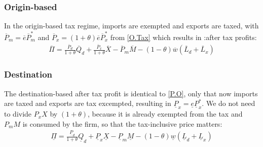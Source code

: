 \subsubsection*{Origin-based}
In the origin-based tax regime, imports are exempted and exports are taxed, with $\overline P_m = \overline e \overline P_m^*$ and $\overline P_x = (1+\theta) \overline e \overline P_x^* $ from \eqref{O.Tax} which results in :after tax profits:  
\begin{equation}\label{P.O}
\begin{aligned}
\overline \Pi = \frac{\overline P_d}{1+\theta}\overline Q_d + \frac{\overline P_x}{1+\theta}\overline X - \overline P_m \overline M -  \left( 1-\theta \right) \overline w  \left( \overline L_d + \overline L_x \right)  
\end{aligned}
\end{equation}

\subsubsection*{Destination}
The destination-based after tax profit is identical to \eqref{P.O}, only that now imports are taxed and exports are tax excempted, resulting  in $\underline P_x =  \underline e \underline P_x^* $. We do not need to divide $P_x X$ by $(1+\theta)$, because it is already exempted from the tax and $P_m M$ is consumed by the firm, so that the tax-inclusive price matters:
\begin{equation}\label{P.D}
\begin{aligned}
\underline \Pi = \frac{\underline P_d}{1+\theta}\underline Q_d +\underline P_x\underline X - \underline P_m \underline M -  \left( 1-\theta \right) \underline w  \left( \underline L_d + \underline L_x \right) 
\end{aligned}
\end{equation}

